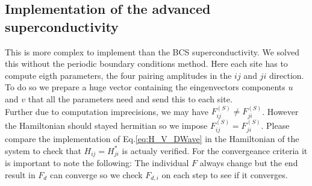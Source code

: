 \documentclass[../main.tex]{subfile}
\begin{document}
\subsection{Implementation of the advanced superconductivity}
This is more complex to implement than the BCS superconductivity. We solved this without the periodic boundary conditions method.
Here each site has to compute eigth parameters, the four pairing amplitudes in the $ij$ and $ji$ direction.
To do so we prepare a huge vector containing the eingenvectors components $u$ and $v$ that all the parameters need and send this to each site.\\
Further due to computation imprecisions, we may have $F^{(S)}_{ij} \neq F^{(S)}_{ji}$. However the Hamiltonian
should stayed hermitian so we impose $F^{(S)}_{ij} = F^{(S)}_{ji}$. Please compare the implementation of Eq.\ref{eq:H_V_DWave} in 
the Hamiltonian of the system to check that $H_{ij} = H_{ji}^{\ast}$ is
actualy verified. For the convergeance criteria it is important to note the following:
The individual $F$ always change but the end result in $F_d$ can converge so we check $F_{d,i}$ on each step to see if it converges.
\end{document}
